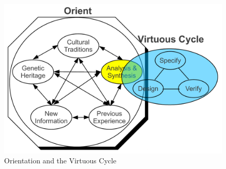 \begin{figure}[tb]
  \centering
  \includegraphics[width=0.6\linewidth]{Figures/Introduction/OrientVirtuousCycle}
  \caption{Orientation and the Virtuous Cycle}
  \label{fig:orient-virtuous-cycle}
\end{figure}

